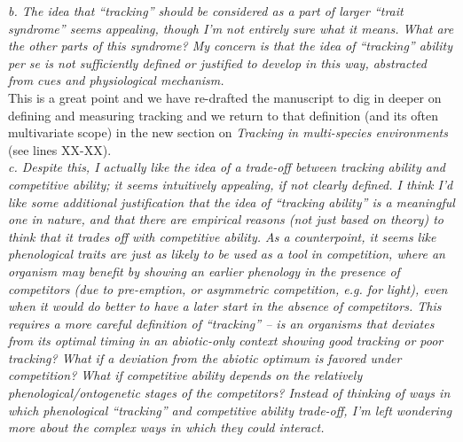 \documentclass[11pt]{article}
\begin{document}
\emph{b.      The idea that ``tracking'' should be considered as a part of larger ``trait syndrome''
seems appealing, though I’m not entirely sure what it means. What are the other parts of this
syndrome? My concern is that the idea of ``tracking'' ability per se is not sufficiently
defined or justified to develop in this way, abstracted from cues and physiological
mechanism.}\\

This is a great point and we have re-drafted the manuscript to dig in deeper on defining and measuring tracking and we return to that definition (and its often multivariate scope) in the new section on \emph{Tracking in multi-species environments} (see lines XX-XX).\\

\emph{c.      Despite this, I actually like the idea of a trade-off between tracking ability and
competitive ability; it seems intuitively appealing, if not clearly defined. I think I’d like
some additional justification that the idea of ``tracking ability'' is a meaningful one in
nature, and that there are empirical reasons (not just based on theory) to think that it
trades off with competitive ability. As a counterpoint, it seems like phenological traits are
just as likely to be used as a tool in competition, where an organism may benefit by showing
an earlier phenology in the presence of competitors (due to pre-emption, or asymmetric
competition, e.g. for light), even when it would do better to have a later start in the
absence of competitors. This requires a more careful definition of ``tracking'' – is an
organisms that deviates from its optimal timing in an abiotic-only context showing good
tracking or poor tracking?  What if a deviation from the abiotic optimum is favored under
competition? What if competitive ability depends on the relatively phenological/ontogenetic
stages of the competitors? Instead of thinking of ways in which phenological “tracking” and
competitive ability trade-off, I’m left wondering more about the complex ways in which they
could interact.}\\
\end{document}
